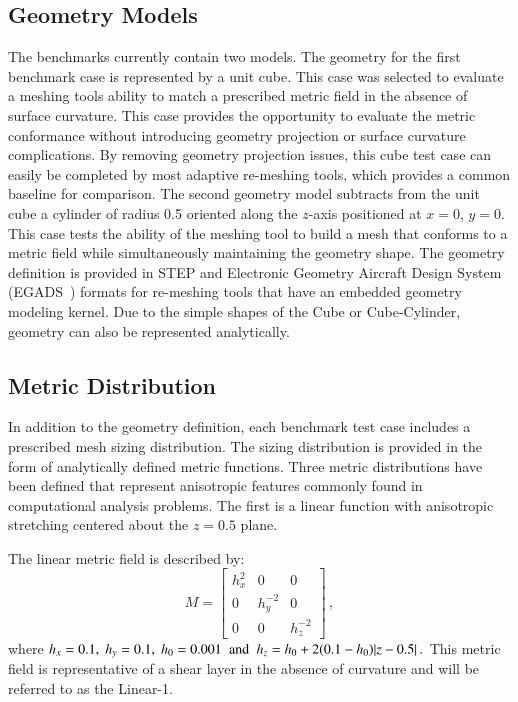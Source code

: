 \documentclass[3p,times,procedia,number]{elsarticle}
\begin{document}
\subsection{Geometry Models}

The benchmarks currently contain two models.
The geometry for the first benchmark case is represented by a unit cube.
This case was selected to evaluate a meshing tools ability to match a prescribed metric field in the absence of surface curvature.
This case provides the opportunity to evaluate the metric conformance without introducing geometry projection or surface curvature complications.
By removing geometry projection issues, this cube test case can easily be completed by most adaptive re-meshing tools,
which provides a common baseline for comparison.
The second geometry model subtracts from the unit cube a cylinder of radius 0.5 oriented along the $z$-axis positioned at $x=0$, $y=0$.
This case tests the ability of the meshing tool to build a mesh that conforms to a metric field while simultaneously maintaining the geometry shape.
The geometry definition is provided in STEP and 
Electronic Geometry Aircraft Design System
(EGADS~\cite{haimes-drela-egads})
formats for re-meshing tools that have an embedded geometry modeling kernel.
Due to the simple shapes of the Cube or Cube-Cylinder,
geometry can also be represented analytically.   

\subsection{Metric Distribution}

In addition to the geometry definition, each benchmark test case includes a prescribed mesh sizing distribution.
The sizing distribution is provided in the form of analytically defined metric functions.
Three metric distributions have been defined that represent anisotropic features commonly found in computational analysis problems.
The first is a linear function with anisotropic stretching centered about the $z=0.5$ plane.

The linear metric field is described by:
\begin{equation}
\label{eq:Linear1}
M = \begin{bmatrix}
h_x^2 & 0 & 0 \\
0 & h_y^{-2} & 0 \\
0 & 0 & h_z^{-2} 
\end{bmatrix} \,,
\end{equation}
where
$h_x = 0.1,\; h_y = 0.1,\; h_0 = 0.001 \textrm{\; and\; } h_z = h_0 + 2 (0.1-h_0) |z-0.5|\,.$
This metric field is representative of a shear layer in
the absence of curvature and will be referred to as the Linear-1.  
\end{document}
